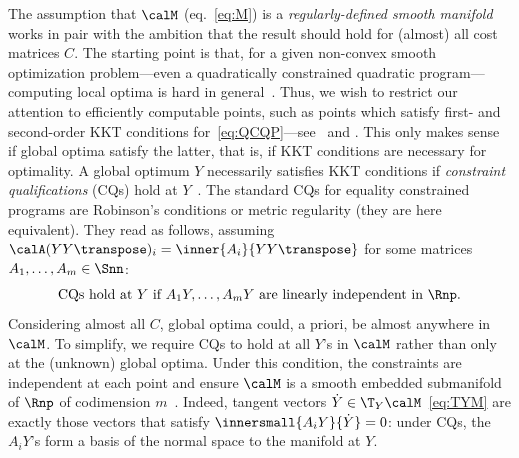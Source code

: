 \documentclass{article}
\newcommand{\1}{\mathbf{1}}
\begin{document}
The assumption that $\calM$ (eq.~\eqref{eq:M}) is a \emph{regularly-defined smooth manifold} works in pair with the am\-bi\-tion that the result should hold for (almost) all cost matrices $C$. The starting point is that, for a given non-convex smooth optimization problem---even a quadratically constrained quadratic program---computing local optima is hard in general~\citep{vavasis1991nonlinear}. Thus, we wish to restrict our attention to efficiently computable points, such as points which satisfy first- and second-order KKT conditions for~\eqref{eq:QCQP}---see~\cite[\S2.2]{sdplr} and \cite[\S3]{ruszczynski2006nonlinear}. This only makes sense if global optima satisfy the latter, that is, if KKT conditions are necessary for optimality. A global optimum $Y$ necessarily satisfies KKT conditions if \emph{constraint qualifications} (CQs) hold at $Y$~\citep{ruszczynski2006nonlinear}. The standard CQs for equality constrained programs are Robinson's conditions or metric regularity (they are here equivalent). They read as follows, assuming $\calA(YY\transpose)_i = \inner{A_i}{YY\transpose}$ for some matrices $A_1, \ldots, A_m \in \Snn$:
\begin{align}
	\textrm{CQs hold at } Y \textrm{ if } A_1Y, \ldots, A_mY \textrm{ are linearly independent in } \Rnp.
	\label{eq:CQ}
\end{align}
Considering almost all $C$, global optima could, a priori, be almost anywhere in $\calM$.
To simplify, we require CQs to hold at all $Y$'s in $\calM$ rather than only at the (unknown) global optima.
Under this condition, the constraints are independent at each point and ensure $\calM$ is a smooth embedded submanifold of $\Rnp$ of codimension $m$~\citep[Prop.\,3.3.3]{AMS08}. Indeed, tangent vectors $\dot Y \in \T_Y\calM$~\eqref{eq:TYM} are exactly those vectors that satisfy $\innersmall{A_i Y}{\dot Y} = 0$: under CQs, the $A_iY$'s form a basis of the normal space to the manifold at $Y$. %
\end{document}
